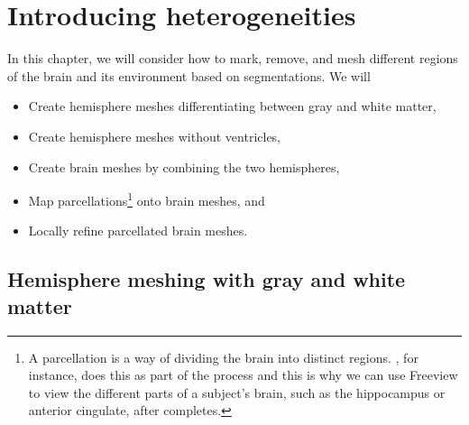 \chapter{Introducing heterogeneities}
\label{chp:chp4}

In this chapter, we will consider how to mark, remove, and mesh
different regions of the brain and its environment based on
{\freesurfer} segmentations. We will
\begin{itemize}
\item
  Create hemisphere meshes differentiating between gray and white matter,
\item
  Create hemisphere meshes without ventricles,
\item
  Create brain meshes by combining the two hemispheres,
\item
  Map parcellations\footnote{A parcellation is a way of dividing the brain 
  into distinct regions. {\freesurfer}, for instance, does this as part of 
  the  process and this is why we can use Freeview to view the 
  different parts of a subject's brain, such as the hippocampus or anterior 
  cingulate, after  completes.} 
  onto brain meshes, and
\item
  Locally refine parcellated brain meshes.
\end{itemize}

\section{Hemisphere meshing with gray and white matter}
\label{sec:chp4:tools:gray-white}

